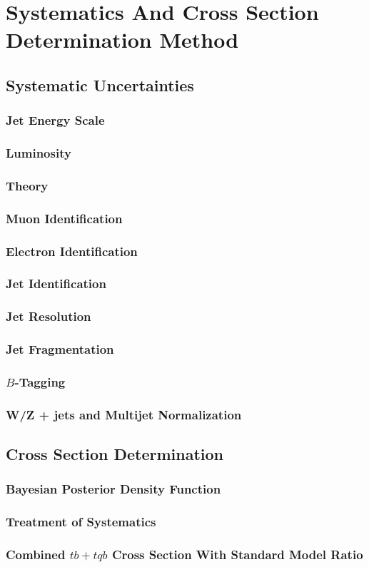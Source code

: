 \chapter{Systematics And Cross Section Determination Method}

\section{Systematic Uncertainties}
\label{systematics}

\subsection{Jet Energy Scale}
\subsection{Luminosity}
\subsection{Theory}
\subsection{Muon Identification}
\subsection{Electron Identification}
\subsection{Jet Identification}
\subsection{Jet Resolution}
\subsection{Jet Fragmentation}
\subsection{$B$-Tagging}
\subsection{W/Z + jets and Multijet Normalization}

\section{Cross Section Determination}

\subsection{Bayesian Posterior Density Function}
\subsection{Treatment of Systematics}
\subsection{Combined $tb+tqb$ Cross Section With Standard Model Ratio}